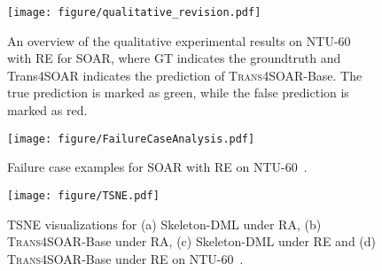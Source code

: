 \documentclass[lettersize,journal]{IEEEtran}
\begin{document}
\begin{figure*}[t]
\begin{center}
\texttt{[image: figure/qualitative\_revision.pdf]}
\end{center}
\caption{An overview of the qualitative experimental results  on NTU-60~\cite{shahroudy2016ntu} with RE for SOAR, where GT indicates the groundtruth and Trans4SOAR indicates the prediction of \textsc{Trans4SOAR}-Base. The true prediction is marked as green, while the false prediction is marked as red. }

\label{fig:qualitative}
\end{figure*}
\begin{figure}[t]
\begin{center}
\texttt{[image: figure/FailureCaseAnalysis.pdf]}
\end{center}
\caption{Failure case examples for SOAR with RE on NTU-60~\cite{shahroudy2016ntu}.}
\label{fig:failure_case}
\end{figure}
\begin{figure}[t]
\begin{center}
\texttt{[image: figure/TSNE.pdf]}
\end{center}
\caption{TSNE visualizations for (a) Skeleton-DML under RA, (b) \textsc{Trans4SOAR}-Base under RA, (c) Skeleton-DML under RE and (d) \textsc{Trans4SOAR}-Base under RE on NTU-60~\cite{shahroudy2016ntu}.}
\label{fig:tsne_case}
\end{figure}
\end{document}
